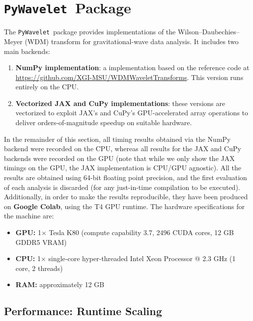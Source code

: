 \documentclass[%
 reprint,
superscriptaddress,
nofootinbib,
 amsmath,amssymb,
 aps,
colorlinks = true, 
linkcolor = blue, 
urlcolor = blue, 
citecolor = blue, 
anchorcolor = blue,
]{revtex4-2}
\newcommand{\package}{\texttt{PyWavelet}}
\begin{document}
\section{\package\ Package}

\label{sec:code_package}

The \package\ package provides implementations of the Wilson–Daubechies–Meyer (WDM) transform for gravitational-wave data analysis. It includes two main backends:

\begin{enumerate}
    \item \textbf{NumPy implementation}: a implementation based on the reference code at \url{https://github.com/XGI-MSU/WDMWaveletTransforms}. This version runs entirely on the CPU.
    \item \textbf{Vectorized JAX and CuPy implementations}: these versions are vectorized to exploit JAX's and CuPy's GPU-accelerated array operations to deliver orders-of-magnitude speedup on suitable hardware. 
\end{enumerate}

In the remainder of this section, all timing results obtained via the NumPy backend were recorded on the CPU, whereas all results for the JAX and CuPy backends were recorded on the GPU (note that while we only show the JAX timings on the GPU, the JAX implementation is CPU/GPU agnostic). 
All the results are obtained using 64-bit floating point precision, and the first evaluation of each analysis is discarded (for any just-in-time compilation to be executed).
Additionally, in order to make the results reproducible, they have been produced on \textbf{Google Colab}, using the T4 GPU runtime. 
The hardware specifications for the machine are:

\begin{itemize}
    \item \textbf{GPU:} 1× Tesla K80 (compute capability 3.7, 2496 CUDA cores, 12 GB GDDR5 VRAM)
    \item \textbf{CPU:} 1× single‐core hyper‐threaded Intel Xeon Processor @ 2.3 GHz (1 core, 2 threads)
    \item \textbf{RAM:} approximately 12 GB
\end{itemize}

\subsection{Performance: Runtime Scaling}
\label{subsec:runtime_scaling}
\end{document}
